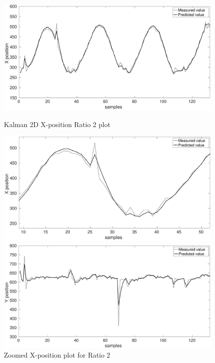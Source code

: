 \documentclass[12pt]{article}
\begin{document}
\begin{figure}[hb!]
\centering
\begin{minipage}{0.5\textwidth}
\centering
	\includegraphics[width = \textwidth]{./Figures/part2Ratio2X.eps}
	\caption{Kalman 2D X-position Ratio 2 plot }
	\label{fig:kalman 2D XRat2}
\end{minipage}%
\begin{minipage}{0.5\textwidth}
\centering
	\includegraphics[width = \textwidth]{./Figures/part2Ratio2Xzoomed.eps}
	\caption{ Zoomed X-position plot for Ratio 2}
	\label{fig: kalman 2D XRat2 zoom}
\end{minipage}
\begin{minipage}{0.5\textwidth}
\centering
	\includegraphics[width = \textwidth]{./Figures/part2Ratio2Y.eps}

\end{minipage}
\end{figure}
\end{document}
